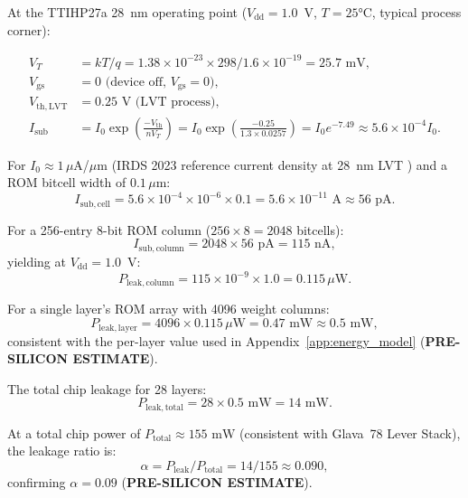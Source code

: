 At the TTIHP27a 28~nm operating point (\(V_{\mathrm{dd}} = 1.0\)~V,
\(T = 25\)°C, typical process corner):

\begin{align}
  V_T &= kT/q = 1.38 \times 10^{-23} \times 298 / 1.6 \times 10^{-19}
        = 25.7\text{ mV}, \label{eq:vt} \\
  V_{\mathrm{gs}} &= 0 \text{ (device off, }V_{\mathrm{gs}} = 0\text{)}, \\
  V_{\mathrm{th,LVT}} &= 0.25\text{ V (LVT process)}, \\
  I_{\mathrm{sub}} &= I_0 \exp\!\left(\frac{-V_{\mathrm{th}}}{n V_T}\right)
  = I_0 \exp\!\left(\frac{-0.25}{1.3 \times 0.0257}\right)
  = I_0 e^{-7.49}
  \approx 5.6 \times 10^{-4} I_0.
  \label{eq:isub_calc}
\end{align}

For \(I_0 \approx 1\,\mu\)A/\(\mu\)m (IRDS 2023 reference current density
at 28~nm LVT \cite{irds2023}) and a ROM bitcell width of \(0.1\,\mu\)m:
\[
  I_{\mathrm{sub, cell}} = 5.6 \times 10^{-4} \times 10^{-6} \times 0.1
  = 5.6 \times 10^{-11}\text{ A} \approx 56\text{ pA}.
\]

For a 256-entry 8-bit ROM column (\(256 \times 8 = 2048\) bitcells):
\[
  I_{\mathrm{sub, column}} = 2048 \times 56\text{ pA} = 115\text{ nA},
\]
yielding at \(V_{\mathrm{dd}} = 1.0\)~V:
\[
  P_{\mathrm{leak, column}} = 115 \times 10^{-9} \times 1.0 = 0.115\,\mu\text{W}.
\]

For a single layer's ROM array with 4096 weight columns:
\[
  P_{\mathrm{leak, layer}} = 4096 \times 0.115\,\mu\text{W} = 0.47\text{ mW}
  \approx 0.5\text{ mW},
\]
consistent with the per-layer value used in
Appendix~\ref{app:energy_model} (\textbf{PRE-SILICON ESTIMATE}).

The total chip leakage for 28 layers:
\[
  P_{\mathrm{leak, total}} = 28 \times 0.5\text{ mW} = 14\text{ mW}.
\]

At a total chip power of \(P_{\mathrm{total}} \approx 155\text{ mW}\)
(consistent with Glava~78 Lever Stack), the leakage ratio is:
\[
  \alpha = P_{\mathrm{leak}} / P_{\mathrm{total}} = 14/155 \approx 0.090,
\]
confirming \(\alpha = 0.09\) (\textbf{PRE-SILICON ESTIMATE}).

